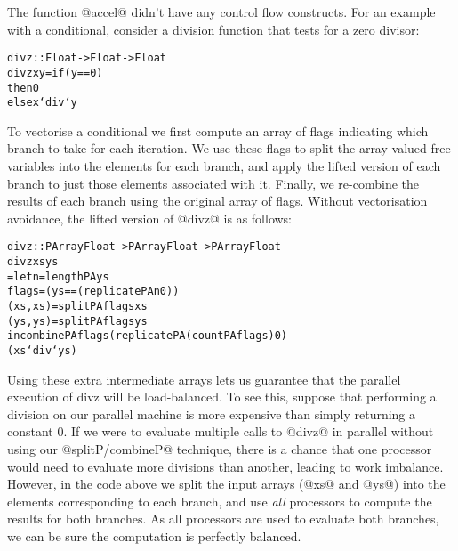 The function @accel@ didn't have any control flow constructs. For an example with a conditional, consider a division function that tests for a zero divisor:
%
\begin{small}
\begin{alltt}
  divz :: Float -> Float -> Float
  divz x y = if (y == 0)
              then 0   
              else x `div` y
\end{alltt}
\end{small}
%
To vectorise a conditional we first compute an array of flags indicating which branch to take for each iteration. We use these flags to split the array valued free variables into the elements for each branch, and apply the lifted version of each branch to just those elements associated with it. Finally, we re-combine the results of each branch using the original array of flags. Without vectorisation avoidance, the lifted version of @divz@ is as follows:
%
\begin{small}
\begin{alltt}
  divz :: PArray Float -> PArray Float -> PArray Float
  divz xs ys 
   = let n               = lengthPA ys
         flags           = (ys == (replicatePA n 0))
         (xs, xs) = splitPA flags xs
         (ys, ys) = splitPA flags ys
     in  combinePA flags (replicatePA (countPA flags) 0)
                         (xs `div` ys)
\end{alltt}
\end{small}
%
Using these extra intermediate arrays lets us guarantee that the parallel execution of divz will be load-balanced. To see this, suppose that performing a division on our parallel machine is more expensive than simply returning a constant 0. If we were to evaluate multiple calls to @divz@ in parallel without using our @splitP/combineP@ technique, there is a chance that one processor would need to evaluate more divisions than another, leading to work imbalance. However, in the code above we split the input arrays (@xs@ and @ys@) into the elements corresponding to each branch, and use \emph{all} processors to compute the results for both branches. As all processors are used to evaluate both branches, we can be sure the computation is perfectly balanced.
 
